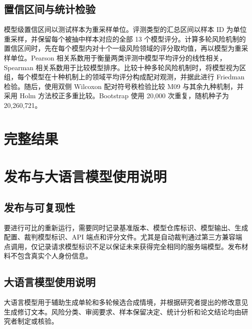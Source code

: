 \subsection{置信区间与统计检验}

模型级置信区间以测试样本为重采样单位。评测类型的汇总区间以样本 ID 为单位重采样，并保留每个被抽中样本对应的全部 13 个模型评分。计算多轮风险机制的置信区间时，先在每个模型内对十个一级风险领域的评分取均值，再以模型为重采样单位。Pearson 相关系数用于衡量两类评测中模型平均评分的线性相关，Spearman 相关系数用于比较模型排序。比较十种多轮风险机制时，将模型视为区组，每个模型在十种机制上的领域平均评分构成配对观测，并据此进行 Friedman 检验。随后，使用双侧 Wilcoxon 配对符号秩检验比较 M09 与其余九种机制，并采用 Holm 方法校正多重比较。Bootstrap 使用 20,000 次重复，随机种子为 20,260,721。

\clearpage
\section{完整结果}
\label{sec:supp-results}



\FloatBarrier

\section{发布与大语言模型使用说明}
\label{sec:supp-release}

\subsection{发布与可复现性}

要进行可比的重新运行，需要同时记录基准版本、模型仓库标识、模型输出、生成配置、裁判模型标识、API 端点和评分文件。尤其是自动裁判通过第三方兼容端点调用，仅记录请求模型标识不足以保证未来获得完全相同的服务端模型。发布材料不包含真实个人身份信息。

\subsection{大语言模型使用说明}

大语言模型用于辅助生成单轮和多轮候选合成情境，并根据研究者提出的修改意见生成修订文本。风险分类、审阅要求、样本保留决定、统计分析和论文结论均由研究者制定或核验。
